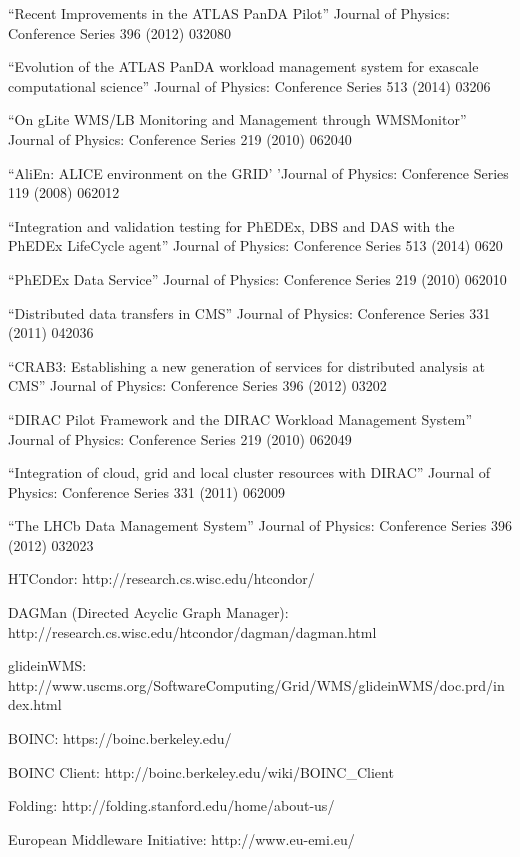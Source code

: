 \begin{thebibliography}{99}
 ``Recent Improvements in the ATLAS PanDA Pilot'' Journal of Physics: Conference Series 396 (2012) 032080

 ``Evolution of the ATLAS PanDA workload management system for exascale computational science'' Journal of Physics: Conference Series 513 (2014) 03206

 ``On gLite WMS/LB Monitoring and Management through WMSMonitor'' Journal of Physics: Conference Series 219 (2010) 062040

 ``AliEn: ALICE environment on the GRID' 'Journal of Physics: Conference Series 119 (2008) 062012

 ``Integration and validation testing for PhEDEx, DBS and DAS with the PhEDEx LifeCycle agent'' Journal of Physics: Conference Series 513 (2014) 0620

 ``PhEDEx Data Service'' Journal of Physics: Conference Series 219 (2010) 062010

 ``Distributed data transfers in CMS'' Journal of Physics: Conference Series 331 (2011) 042036

 ``CRAB3: Establishing a new generation of services for distributed analysis at CMS'' Journal of Physics: Conference Series 396 (2012) 03202

 ``DIRAC Pilot Framework and the DIRAC Workload Management System'' Journal of Physics: Conference Series 219 (2010) 062049

 ``Integration of cloud, grid and local cluster resources with DIRAC'' Journal of Physics: Conference Series 331 (2011) 062009

 ``The LHCb Data Management System'' Journal of Physics: Conference Series 396 (2012) 032023

 HTCondor: http://research.cs.wisc.edu/htcondor/

 DAGMan (Directed Acyclic Graph Manager): http://research.cs.wisc.edu/htcondor/dagman/dagman.html

 glideinWMS: http://www.uscms.org/SoftwareComputing/Grid/WMS/glideinWMS/doc.prd/index.html

 BOINC: https://boinc.berkeley.edu/

 BOINC Client: http://boinc.berkeley.edu/wiki/BOINC\_Client

 Folding: http://folding.stanford.edu/home/about-us/

 European Middleware Initiative: http://www.eu-emi.eu/
\end{thebibliography}
